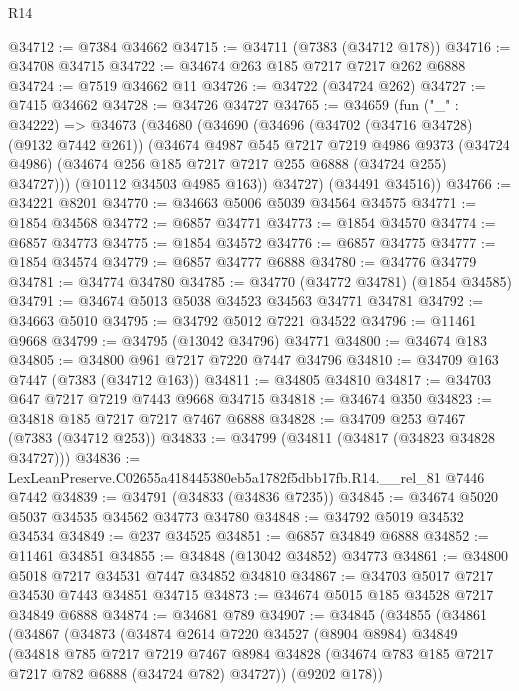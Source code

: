\begin{lexlean}{R14}
\begin{coremodule}
@34712 := @7384 @34662
@34715 := @34711 (@7383 (@34712 @178))
@34716 := @34708 @34715
@34722 := @34674 @263 @185 @7217 @7217 @262 @6888
@34724 := @7519 @34662 @11
@34726 := @34722 (@34724 @262)
@34727 := @7415 @34662
@34728 := @34726 @34727
@34765 := @34659
    (fun ("_" : @34222) =>
    @34673
      (@34680
        (@34690
          (@34696
            (@34702 (@34716 @34728) (@9132 @7442 @261))
            (@34674
              @4987
              @545
              @7217
              @7219
              @4986
              @9373
              (@34724 @4986)
              (@34674 @256 @185 @7217 @7217 @255 @6888 (@34724 @255) @34727)))
          (@10112 @34503 @4985 @163))
        @34727)
      (@34491 @34516))
@34766 := @34221 @8201
@34770 := @34663 @5006 @5039 @34564 @34575
@34771 := @1854 @34568
@34772 := @6857 @34771
@34773 := @1854 @34570
@34774 := @6857 @34773
@34775 := @1854 @34572
@34776 := @6857 @34775
@34777 := @1854 @34574
@34779 := @6857 @34777 @6888
@34780 := @34776 @34779
@34781 := @34774 @34780
@34785 := @34770 (@34772 @34781) (@1854 @34585)
@34791 := @34674 @5013 @5038 @34523 @34563 @34771 @34781
@34792 := @34663 @5010
@34795 := @34792 @5012 @7221 @34522
@34796 := @11461 @9668
@34799 := @34795 (@13042 @34796) @34771
@34800 := @34674 @183
@34805 := @34800 @961 @7217 @7220 @7447 @34796
@34810 := @34709 @163 @7447 (@7383 (@34712 @163))
@34811 := @34805 @34810
@34817 := @34703 @647 @7217 @7219 @7443 @9668 @34715
@34818 := @34674 @350
@34823 := @34818 @185 @7217 @7217 @7467 @6888
@34828 := @34709 @253 @7467 (@7383 (@34712 @253))
@34833 := @34799 (@34811 (@34817 (@34823 @34828 @34727)))
@34836 := LexLeanPreserve.C02655a418445380eb5a1782f5dbb17fb.R14.__rel_81 @7446 @7442
@34839 := @34791 (@34833 (@34836 @7235))
@34845 := @34674 @5020 @5037 @34535 @34562 @34773 @34780
@34848 := @34792 @5019 @34532 @34534
@34849 := @237 @34525
@34851 := @6857 @34849 @6888
@34852 := @11461 @34851
@34855 := @34848 (@13042 @34852) @34773
@34861 := @34800 @5018 @7217 @34531 @7447 @34852 @34810
@34867 := @34703 @5017 @7217 @34530 @7443 @34851 @34715
@34873 := @34674 @5015 @185 @34528 @7217 @34849 @6888
@34874 := @34681 @789
@34907 := @34845
    (@34855
      (@34861
        (@34867
          (@34873
            (@34874
              @2614
              @7220
              @34527
              (@8904 @8984)
              @34849
              (@34818
                @785
                @7217
                @7219
                @7467
                @8984
                @34828
                (@34674 @783 @185 @7217 @7217 @782 @6888 (@34724 @782) @34727))
              (@9202 @178))

\end{coremodule}
\end{lexlean}
